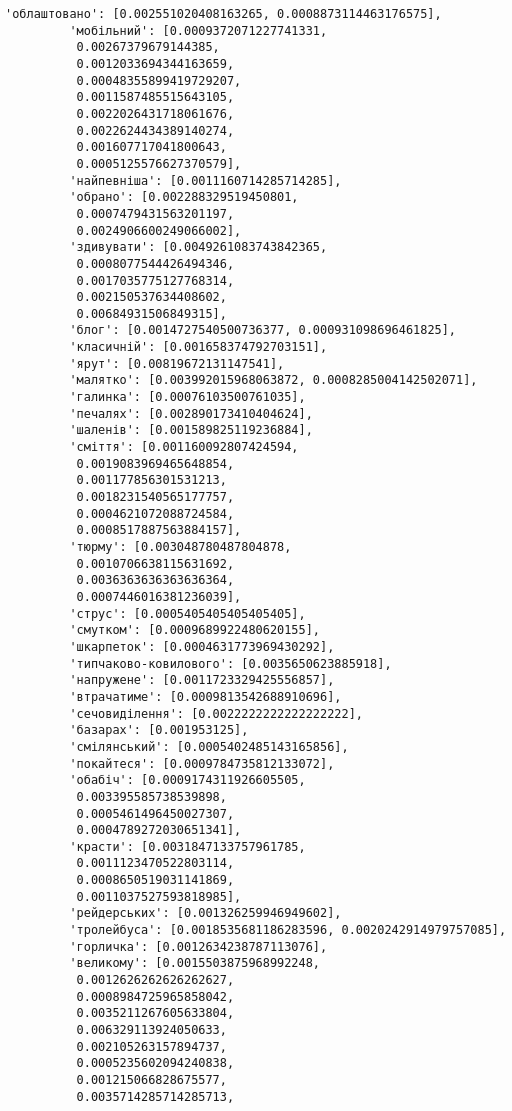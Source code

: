 \documentclass[11pt]{article}
\begin{document}
\begin{Verbatim}[commandchars=\\\{\}]
         'облаштовано': [0.002551020408163265, 0.0008873114463176575],
         'мобільний': [0.0009372071227741331,
          0.00267379679144385,
          0.0012033694344163659,
          0.00048355899419729207,
          0.0011587485515643105,
          0.0022026431718061676,
          0.0022624434389140274,
          0.001607717041800643,
          0.0005125576627370579],
         'найпевніша': [0.0011160714285714285],
         'обрано': [0.002288329519450801,
          0.0007479431563201197,
          0.0024906600249066002],
         'здивувати': [0.0049261083743842365,
          0.0008077544426494346,
          0.0017035775127768314,
          0.002150537634408602,
          0.00684931506849315],
         'блог': [0.0014727540500736377, 0.000931098696461825],
         'класичній': [0.001658374792703151],
         'ярут': [0.00819672131147541],
         'малятко': [0.003992015968063872, 0.0008285004142502071],
         'галинка': [0.00076103500761035],
         'печалях': [0.002890173410404624],
         'шаленів': [0.001589825119236884],
         'сміття': [0.001160092807424594,
          0.0019083969465648854,
          0.001177856301531213,
          0.0018231540565177757,
          0.0004621072088724584,
          0.0008517887563884157],
         'тюрму': [0.003048780487804878,
          0.0010706638115631692,
          0.0036363636363636364,
          0.0007446016381236039],
         'струс': [0.0005405405405405405],
         'смутком': [0.0009689922480620155],
         'шкарпеток': [0.0004631773969430292],
         'типчаково-ковилового': [0.0035650623885918],
         'напружене': [0.0011723329425556857],
         'втрачатиме': [0.0009813542688910696],
         'сечовиділення': [0.0022222222222222222],
         'базарах': [0.001953125],
         'смілянський': [0.0005402485143165856],
         'покайтеся': [0.0009784735812133072],
         'обабіч': [0.0009174311926605505,
          0.003395585738539898,
          0.0005461496450027307,
          0.0004789272030651341],
         'красти': [0.0031847133757961785,
          0.0011123470522803114,
          0.0008650519031141869,
          0.0011037527593818985],
         'рейдерських': [0.001326259946949602],
         'тролейбуса': [0.0018535681186283596, 0.0020242914979757085],
         'горличка': [0.0012634238787113076],
         'великому': [0.0015503875968992248,
          0.0012626262626262627,
          0.0008984725965858042,
          0.0035211267605633804,
          0.006329113924050633,
          0.002105263157894737,
          0.0005235602094240838,
          0.001215066828675577,
          0.0035714285714285713,

\end{Verbatim}
\end{document}
